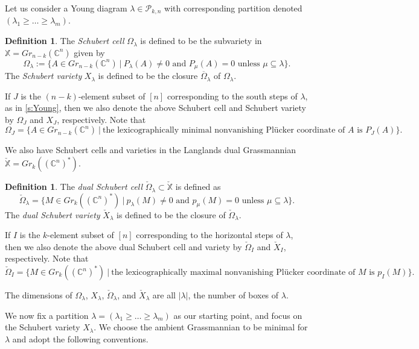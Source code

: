 \documentclass{amsart}
\theoremstyle{definition}
\newtheorem{definition}[thm]{Definition}
\numberwithin{equation}{section}
\newcommand{\Shkn}{{\mathcal P_{k,n}}}
\newcommand{\C}{\mathbb{C}}
\newcommand{\checkOmega}{\check{\Omega}}
\newcommand{\checkX}{\check{X}}
\newcommand{\X}{\mathbb X}
\begin{document}
Let us consider a Young diagram $\lambda\in\Shkn$ with corresponding partition denoted $(\lambda_1\ge\dotsc\ge\lambda_m)$. 

\begin{definition}\label{d:SchubertCell}
	The \emph{Schubert cell} $\Omega_{\lambda}$  is defined to be the subvariety in $ \X = Gr_{n-k}(\C^n)$ given by
	$$\Omega_{\lambda} := \{A \in Gr_{n-k}(\C^n) \ \vert \ 
	P_{\lambda}(A) \neq 0 \text{ and }P_{\mu}(A)=0 \text{ unless }
	\mu \subseteq \lambda \}.$$
	The \emph{Schubert variety} $X_{\lambda}$ is defined to be the closure
	$\overline{\Omega}_\lambda$ of $\Omega_\lambda$.

	If $J$ is the $(n-k)$-element subset of $[n]$ 
	corresponding to the south
	steps of $\lambda$, as in \cref{s:Young}, then 
	we also denote the above Schubert cell and Schubert variety by 
	$\Omega_{J}$
	and $X_{J}$, respectively. Note that 
	$$\Omega_{J} = \{A \in Gr_{n-k}(\C^n) \ \vert \ 
	\text{the lexicographically minimal nonvanishing
Pl\"ucker coordinate of }A\text{ is }P_{J}(A) \}.$$
\end{definition}

We also have Schubert cells and varieties in the Langlands dual Grassmannian $\mathbb\checkX= Gr_{k}((\C^n)^*)$.
\begin{definition}
The \emph{dual Schubert cell} 
	$\check{\Omega}_{\lambda} \subset \mathbb\checkX $ is defined  as
	$$\check{\Omega}_{\lambda} = \{M \in Gr_{k}((\C^n)^*) \ \vert \ 
	p_{\lambda}(M) \neq 0 \text{ and }p_{\mu}(M)=0 \text{ unless }
	\mu \subseteq \lambda \}.$$
	The \emph{dual Schubert variety} 
	$\check{X}_{\lambda}$ is defined to be the closure
	of $\check{\Omega}_\lambda$.

	If $I$ is the $k$-element subset of $[n]$ 
	corresponding to the horizontal
	steps of $\lambda$, then 
	we also denote the above dual Schubert cell and variety by 
	$\check{\Omega}_{I}$
	and $\check{X}_{I}$, respectively. Note that 
	$$\checkOmega_{I} = \{M \in Gr_{k}((\C^n)^*) \ \vert \ 
	\text{the lexicographically maximal nonvanishing
Pl\"ucker coordinate of }M\text{ is }p_{I}(M) \}.$$
\end{definition}
	
The dimensions of $\Omega_{\lambda}$, $X_{\lambda}$,
$\checkOmega_{\lambda}$, and $\check{X}_{\lambda}$ are all $|\lambda|$, the number of boxes of 
$\lambda$.


We now fix a partition $\lambda=(\lambda_1\ge \dotsc \ge\lambda_m)$ as our starting point, and focus on the Schubert variety $X_\lambda$. We choose the ambient Grassmannian to be minimal for $\lambda$ and adopt the following conventions. 
\end{document}
